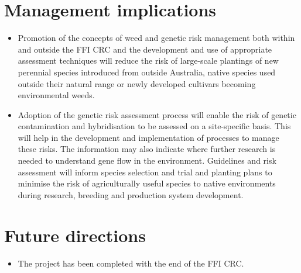 \documentclass[version=last, 
    paper=a4, %
    10pt, %
    usenames,
    dvipsnames, 
    oneside, %
    headings=openany, %
    DIV=15 %
]{scrbook}
\begin{document}
\section*{Management implications}
\begin{itemize}
\itemsep1pt\parskip0pt
\item
  Promotion of the concepts of weed and genetic risk management both
  within and outside the FFI CRC and the development and use of
  appropriate assessment techniques will reduce the risk of large-scale
  plantings of new perennial species introduced from outside Australia,
  native species used outside their natural range or newly developed
  cultivars becoming environmental weeds.
\item
  Adoption of the genetic risk assessment process will enable the risk
  of genetic contamination and hybridisation to be assessed on a
  site-specific basis. This will help in the development and
  implementation of processes to manage these risks. The information may
  also indicate where further research is needed to understand gene flow
  in the environment. Guidelines and risk assessment will inform species
  selection and trial and planting plans to minimise the risk of
  agriculturally useful species to native environments during research,
  breeding and production system development.
\end{itemize}



\section*{Future directions}
\begin{itemize}
\itemsep1pt\parskip0pt
\item
  The project has been completed with the end of the FFI CRC.
\end{itemize}



\end{document}
